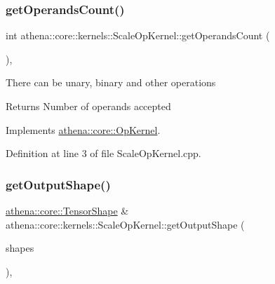 \mbox{\label{classathena_1_1core_1_1kernels_1_1_scale_op_kernel_a4f9e4fee100ed7f09840fa4b2d55f2bf}} 
\subsubsection{\texorpdfstring{get\+Operands\+Count()}{getOperandsCount()}}
{\footnotesize\ttfamily int athena\+::core\+::kernels\+::\+Scale\+Op\+Kernel\+::get\+Operands\+Count (\begin{DoxyParamCaption}{ }\end{DoxyParamCaption})\hspace{0.3cm}{\ttfamily [override]}, {\ttfamily [virtual]}}

There can be unary, binary and other operations \begin{DoxyReturn}{Returns}
Number of operands accepted 
\end{DoxyReturn}


Implements \mbox{\hyperlink{classathena_1_1core_1_1_op_kernel_add97d4c132d80ecd9915acfedf7c9119}{athena\+::core\+::\+Op\+Kernel}}.



Definition at line 3 of file Scale\+Op\+Kernel.\+cpp.

\mbox{\label{classathena_1_1core_1_1kernels_1_1_scale_op_kernel_ad1791a60026e90c95f248202e1404a26}} 
\subsubsection{\texorpdfstring{get\+Output\+Shape()}{getOutputShape()}}
{\footnotesize\ttfamily \mbox{\hyperlink{classathena_1_1core_1_1_tensor_shape}{athena\+::core\+::\+Tensor\+Shape}} \& athena\+::core\+::kernels\+::\+Scale\+Op\+Kernel\+::get\+Output\+Shape (\begin{DoxyParamCaption}\item[{std\+::vector$<$ \mbox{\hyperlink{classathena_1_1core_1_1_tensor_shape}{athena\+::core\+::\+Tensor\+Shape}} $>$ \&}]{shapes }\end{DoxyParamCaption})\hspace{0.3cm}{\ttfamily [override]}, {\ttfamily [virtual]}}

